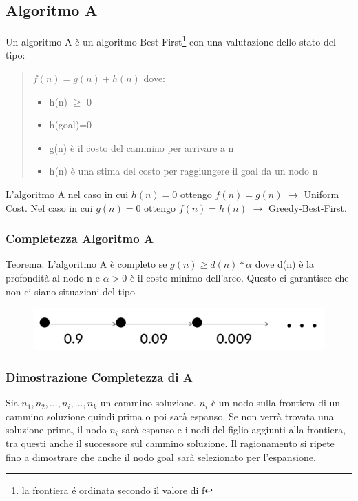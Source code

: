 \documentclass{article}
\begin{document}
\subsection{Algoritmo A}
Un algoritmo A è un algoritmo Best-First\footnote{la frontiera é ordinata secondo il valore di f} con una valutazione dello stato del tipo:
\begin{quote}
    $f(n) = g(n) + h(n) $ dove:
    \begin{itemize}
        \item h(n) $\geq$ 0
        \item h(goal)=0
        \item g(n) è il costo del cammino per arrivare a n
        \item h(n) è una stima del costo per raggiungere il goal da un nodo n
    \end{itemize}
\end{quote}
L'algoritmo A nel caso in cui $h(n) = 0$ ottengo $f(n) = g(n)$ $\rightarrow$ Uniform Cost. \newline
Nel caso in cui $g(n) = 0$ ottengo $f(n) = h(n)$ $\rightarrow$ Greedy-Best-First.

\subsubsection{Completezza Algoritmo A}
Teorema: L'algoritmo A è completo se $g(n) \geq d(n)*\alpha$ dove d(n) è la profondità al nodo n e $\alpha > 0$ è il costo minimo dell'arco. Questo ci garantisce che non ci siano situazioni del tipo 
\begin{figure}[H]
    \centering
    \includegraphics[scale=0.3]{Images/completezzaA.png}
\end{figure}

\subsubsection{Dimostrazione Completezza di A}
Sia $n_1, n_2, ..., n_i, ..., n_k$ un cammino soluzione. \newline
$n_i$ è un nodo sulla frontiera di un cammino soluzione quindi prima o poi sarà espanso. \newline
Se non verrà trovata una soluzione prima, il nodo $n_i$ sarà espanso e i nodi del figlio aggiunti alla frontiera, tra questi anche il successore sul cammino soluzione. Il ragionamento si ripete fino a dimostrare che anche il nodo goal sarà selezionato per l'espansione.
\end{document}
